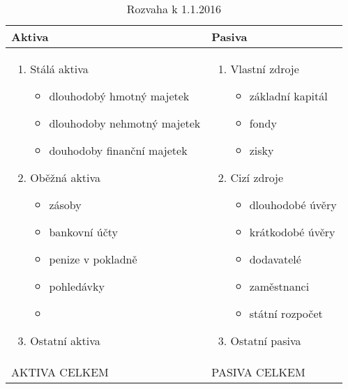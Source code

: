 \documentclass[11pt,a4paper,twoside]{book}
\begin{document}
	\begin{table}[h]
		\caption{Rozvaha k 1.1.2016}
		\begin{tabular}{ p{8cm} | p{8cm} }
			Aktiva &
			Pasiva \\ \hline
			\begin{enumerate}
				\item Stálá aktiva
					\begin{itemize}
						\item dlouhodobý hmotný majetek
						\item dlouhodoby nehmotný majetek
						\item douhodoby finanční majetek
					\end{itemize}
				\item Oběžná aktiva
					\begin{itemize}
						\item zásoby
						\item bankovní účty
						\item penize v pokladně
						\item pohledávky
						\item []
					\end{itemize}
				\item Ostatní aktiva 
			\end{enumerate} &
			\begin{enumerate}
				\item Vlastní zdroje
					\begin{itemize}
						\item základní kapitál
						\item fondy
						\item zisky
					\end{itemize}
				\item Cizí zdroje
					\begin{itemize}
						\item dlouhodobé úvěry
						\item krátkodobé úvěry
						\item dodavatelé
						\item zaměstnanci
						\item státní rozpočet
					\end{itemize}
				\item Ostatní pasiva
			\end{enumerate} \\ \hline
			AKTIVA CELKEM & PASIVA CELKEM \\
		\end{tabular}
	\end{table}
\end{document}
